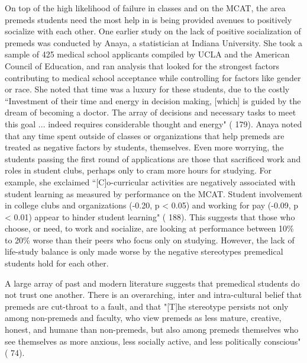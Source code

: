 \documentclass [12pt]{article}
\begin{document}
\begin{flushleft}
On top of the high likelihood of failure in classes and on the MCAT, the area premeds students need the most help in is being provided avenues to positively socialize with each other. One earlier study on the lack of positive socialization of premeds was conducted by Anaya, a statistician at Indiana University. She took a sample of 425 medical school applicants compiled by UCLA and the American Council of Education, and ran analysis that looked for the strongest factors contributing to medical school acceptance while controlling for factors like gender or race. She noted that time was a luxury for these students, due to the costly {``}Investment of their time and energy in decision making, [which] is guided by the dream of becoming a doctor. The array of decisions and necessary tasks to meet this goal ... indeed requires considerable thought and energy" (\cite{Anaya-2001} 179). Anaya noted that any time spent outside of classes or organizations that help premeds are treated as negative factors by students, themselves. Even more worrying, the students passing the first round of applications are those that sacrificed work and roles in student clubs, perhaps only to cram more hours for studying. For example, she exclaimed {``}[C]o-curricular activities are negatively associated with student learning as measured by performance on the MCAT. Student involvement in college clubs and organizations (-0.20, p < 0.05) and working for pay (-0.09, p < 0.01) appear to hinder student learning" (\cite{Anaya-2001} 188). This suggests that those who choose, or need, to work and socialize, are looking at performance between 10\% to 20\% worse than their peers who focus only on studying. However, the lack of life-study balance is only made worse by the negative stereotypes premedical students hold for each other.
	
A large array of past and modern literature suggests that premedical students do not trust one another. There is an overarching, inter and intra-cultural belief that premeds are cut-throat to a fault, and that "[T]he stereotype persists not only among non-premeds and faculty, who view premeds as less mature, creative, honest, and humane than non-premeds, but also among premeds themselves who see themselves as more anxious, less socially active, and less politically conscious" (\cite{Olsen-2016} 74). 
	
	
	
\newpage
\medskip %
\nocite{*} %
\printbibliography%
\end{flushleft}
\end{document}
